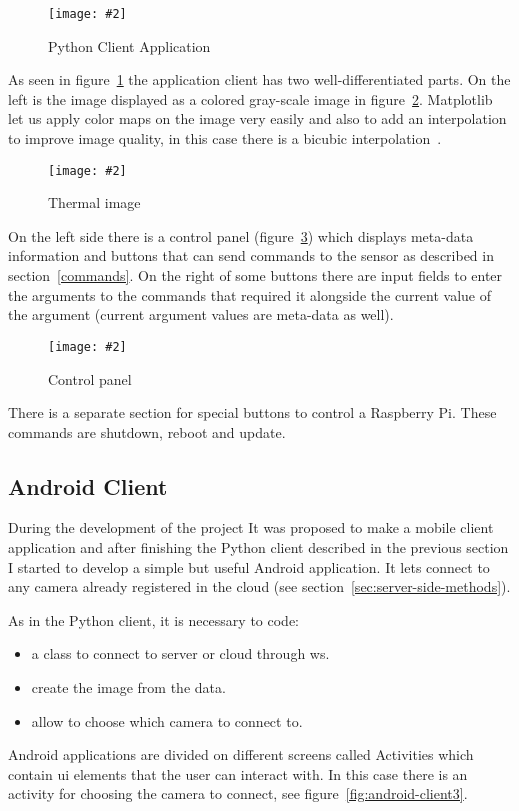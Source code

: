 \documentclass[hidelinks,11pt,a4paper,oneside,article]{memoir}
\newcommand{\putimage}[3][10] %
{
\begin{figure}[h]
	\centering
	\captionsetup{justification=centering}
	\texttt{[image: \#2]}
	\caption{#3}
	\label{fig:#2}
\end{figure}
}
\begin{document}
    \putimage{python-client}{Python Client Application}
    
As seen in figure~\ref{fig:python-client} the application client has two well-differentiated parts. On the left  is the image displayed as a colored gray-scale image in figure~\ref{fig:ir-image}. Matplotlib let us apply color maps on the image very easily and also to add an interpolation to improve image quality, in this case there is a bicubic interpolation~\cite{matplotlibinter}.

    \putimage[5]{ir-image}{Thermal image}

On the left side there is a control panel (figure~\ref{fig:control-panel}) which displays meta-data information and buttons that can send commands to the sensor as described in section~\ref{commands}. On the right of some buttons there are input fields to enter the arguments to the commands that required it alongside the current value of the argument (current argument values are meta-data as well).
\clearpage

    \putimage{control-panel}{Control panel}
    
There is a separate section for special buttons to control a Raspberry Pi. These commands are shutdown, reboot and update.


\subsection{Android Client}
During the development of the project It was proposed to make a mobile client application and after finishing the Python client described in the previous section I started to develop a simple but useful Android application. It lets connect to any camera already registered in the cloud (see  section~\ref{sec:server-side-methods}).

As in the Python client, it is necessary to code:
\begin{itemize}
    \item a class to connect to server or cloud through \gls{ws}.
    \item create the image from the data.
    \item allow to choose which camera to connect to.
\end{itemize}

Android applications are divided on different screens called Activities which contain \gls{ui} elements that the user can interact with. In this case there is an activity for choosing the camera to connect, see figure~\ref{fig:android-client3}.
\end{document}
